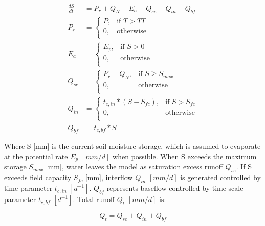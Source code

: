\begin{align}
	\frac{dS}{dt} &= P_r + Q_N - E_a  - Q_{se} - Q_{in} - Q_{bf}\\
	P_r &= \begin{cases}
		P, &\text{if } T > TT \\
		0, & \text{otherwise} \\
	\end{cases} \\
	E_a &= \begin{cases}
		E_p, &\text{if } S > 0 \\
		0, &\text{otherwise} \\
	\end{cases} \\
	Q_{se} &= \begin{cases}
		P_r + Q_N, &\text{if } S \geq S_{max}\\
		0, &\text{otherwise}\\
	\end{cases}\\
	Q_{in} &= \begin{cases}
		t_{c,in}*(S-S_{fc}), &\text{if } S > S_{fc} \\
		0, &\text{otherwise}\\
		\end{cases}\\
	Q_{bf} &= t_{c,bf}*S	
\end{align}

Where S [mm] is the current soil moisture storage, which is assumed to evaporate at the potential rate $E_p$ $[mm/d]$ when possible. When S exceeds the maximum storage $S_{max}$ [mm], water leaves the model as saturation excess runoff $Q_{se}$. If S exceeds field capacity $S_{fc}$ [mm], interflow $Q_{in}$ $[mm/d]$ is generated controlled by time parameter $t_{c,in}$ $[d^{-1}]$. $Q_{bf}$ represents baseflow controlled by time scale parameter $t_{c,bf}$ $[d^{-1}]$. Total runoff $Q_t$ $[mm/d]$ is:

\begin{equation}
	Q_t = Q_{se} + Q_{in} + Q_{bf}
\end{equation}

